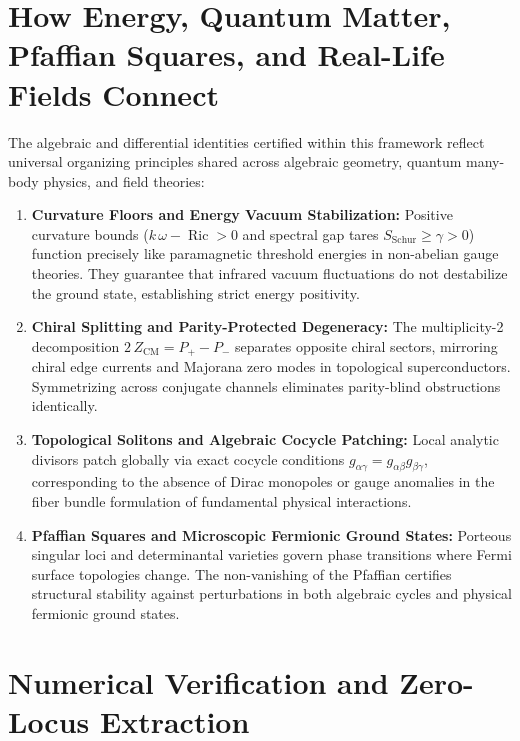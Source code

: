 \documentclass[11pt,a4paper]{article}
\theoremstyle{definition}
\begin{document}
\section{How Energy, Quantum Matter, Pfaffian Squares, and Real-Life Fields Connect}

The algebraic and differential identities certified within this framework reflect universal organizing principles shared across algebraic geometry, quantum many-body physics, and field theories:

\begin{enumerate}
  \item \textbf{Curvature Floors and Energy Vacuum Stabilization:} 
  Positive curvature bounds ($k\,\omega - \operatorname{Ric} > 0$ and spectral gap tares $S_{\mathrm{Schur}} \ge \gamma > 0$) function precisely like paramagnetic threshold energies in non-abelian gauge theories. They guarantee that infrared vacuum fluctuations do not destabilize the ground state, establishing strict energy positivity.
  
  \item \textbf{Chiral Splitting and Parity-Protected Degeneracy:} 
  The multiplicity-2 decomposition $2\,Z_{\mathrm{CM}} = P_+ - P_-$ separates opposite chiral sectors, mirroring chiral edge currents and Majorana zero modes in topological superconductors. Symmetrizing across conjugate channels eliminates parity-blind obstructions identically.
  
  \item \textbf{Topological Solitons and Algebraic Cocycle Patching:} 
  Local analytic divisors patch globally via exact cocycle conditions $g_{\alpha\gamma} = g_{\alpha\beta} g_{\beta\gamma}$, corresponding to the absence of Dirac monopoles or gauge anomalies in the fiber bundle formulation of fundamental physical interactions.
  
  \item \textbf{Pfaffian Squares and Microscopic Fermionic Ground States:} 
  Porteous singular loci and determinantal varieties govern phase transitions where Fermi surface topologies change. The non-vanishing of the Pfaffian certifies structural stability against perturbations in both algebraic cycles and physical fermionic ground states.
\end{enumerate}

\section{Numerical Verification and Zero-Locus Extraction}
\end{document}
